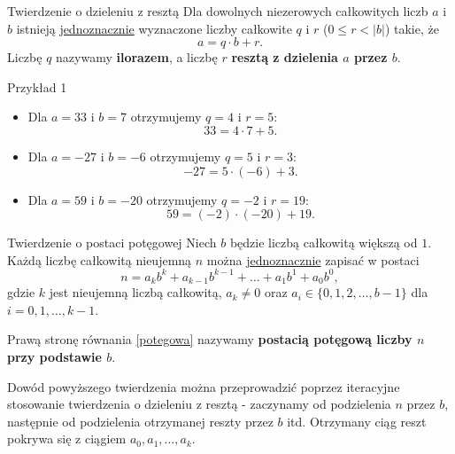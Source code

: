\documentclass[a4paper,10pt]{beamer}
\begin{document}
\begin{frame}
	
\begin{block}{Twierdzenie o dzieleniu z resztą}
	Dla dowolnych niezerowych całkowitych liczb $a$ i $b$ istnieją \underline{jednoznacznie} wyznaczone liczby całkowite $q$ i $r$ ($0\leqslant r<|b|$) takie, że
	$$a=q\cdot b+r.$$
	Liczbę $q$ nazywamy {\bf ilorazem}, a liczbę $r$ {\bf resztą z dzielenia $a$ przez $b$}.
\end{block}

\begin{exampleblock}{Przykład 1}
	\begin{itemize}
		\item Dla $a=33$ i $b=7$ otrzymujemy $q=4$ i $r=5$:
		$$33=4\cdot7+5.$$
		\item Dla $a=-27$ i $b=-6$ otrzymujemy $q=5$ i $r=3$:
		$$-27=5\cdot(-6)+3.$$
		\item Dla $a=59$ i $b=-20$ otrzymujemy $q=-2$ i $r=19$:
		$$59=(-2)\cdot(-20)+19.$$
	\end{itemize}
\end{exampleblock}
\end{frame}




\begin{frame}
	
\begin{block}{Twierdzenie o postaci potęgowej}
	Niech $b$ będzie liczbą całkowitą większą od $1$. Każdą liczbę całkowitą nieujemną $n$ można \underline{jednoznacznie} zapisać w postaci
	\begin{equation}\label{potegowa}
		n=a_kb^k+a_{k-1}b^{k-1}+\ldots+a_1b^1+a_0b^0,
	\end{equation}
	gdzie $k$ jest nieujemną liczbą całkowitą, $a_k\neq0$ oraz $a_i\in\{0,1,2,\ldots,b-1\}$ dla $i=0,1,\ldots,k-1$.
\end{block}	

Prawą stronę równania \eqref{potegowa} nazywamy {\bf postacią potęgową liczby $n$ przy podstawie $b$}.

Dowód powyższego twierdzenia można przeprowadzić poprzez iteracyjne stosowanie twierdzenia o dzieleniu z resztą - zaczynamy od podzielenia $n$ przez $b$, następnie od podzielenia otrzymanej reszty przez $b$ itd. Otrzymany ciąg reszt pokrywa się z ciągiem $a_0,a_1,\ldots,a_k$.
	
\end{frame}
\end{document}
